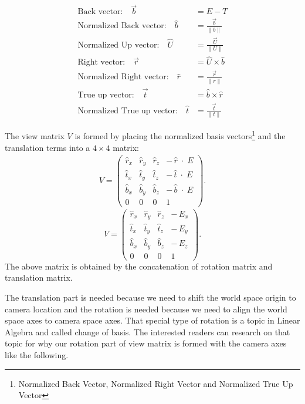\begin{equation}
\begin{aligned}
\text{Back vector:}\quad \vec{b} &= E - T \\
\text{Normalized Back vector:}\quad \hat{b} &= \frac{\vec{b}}{\|b\|} \\
\text{Normalized Up vector:}\quad \hat{U} &= \frac{\vec{U}}{\|U\|} \\
\text{Right vector:}\quad \vec{r} &= \hat{U} \times \hat{b} \\
\text{Normalized Right vector:}\quad  \hat{r} &= \frac{\vec{r}}{\|r\|} \\
\text{True up vector:}\quad \vec{t} &= \hat{b} \times \hat{r}\\
\text{Normalized True up vector:}\quad  \hat{t} &= \frac{\vec{t}}{\|t\|} 
\end{aligned}
\end{equation}

The view matrix $V$ is formed by placing the normalized basis vectors\footnote{Normalized Back Vector, Normalized Right Vector and Normalized True Up Vector} and the translation terms into a $4\times 4$ matrix:
\begin{align*}
V =
\begin{pmatrix}
\hat{r}_x & \hat{r}_y & \hat{r}_z & -\,\hat{r}\;\cdot\;E \\
\hat{t}_x & \hat{t}_y & \hat{t}_z & -\,\hat{t}\;\cdot\;E \\
\hat{b}_x & \hat{b}_y & \hat{b}_z & -\,\hat{b}\;\cdot\;E\\
0         & 0         & 0         & 1
\end{pmatrix}.
\end{align*}
\begin{equation}
V =
\begin{pmatrix}
\hat{r}_x & \hat{r}_y & \hat{r}_z & -\,E_x \\
\hat{t}_x & \hat{t}_y & \hat{t}_z & -\,E_y \\
\hat{b}_x & \hat{b}_y & \hat{b}_z & -\,E_z\\
0         & 0         & 0         & 1
\end{pmatrix}.
\end{equation}
The above matrix is obtained by the concatenation of rotation matrix and translation matrix. 

The translation part is needed because we need to shift the world space origin to camera location and the rotation is needed because we need to align the world space axes to camera space axes. That special type of rotation is a topic in Linear Algebra and called change of basis. The interested readers can research on that topic for why our rotation part of view matrix is formed with the camera axes like the following.

